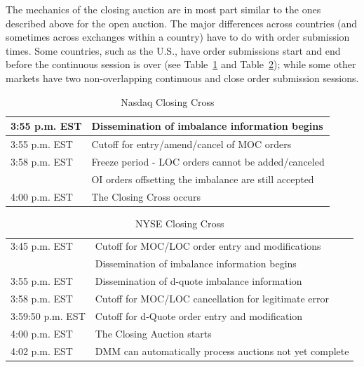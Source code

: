 The mechanics of the closing auction are in most part similar to the ones described above for the open auction. The major differences across countries (and sometimes across exchanges within a country) have to do with order submission times. Some countries, such as the U.S., have order submissions start and end before the continuous session is over (see Table~\ref{tab:NASDAQclose} and Table~\ref{tab:NYSEclose}); while some other markets have two non-overlapping continuous and close order submission sessions.

\begin{table}[!ht]
   \centering
   \caption{Nasdaq Closing Cross\label{tab:NASDAQclose}}
   \begin{tabular}{ll} 
	3:55 p.m. EST & Dissemination of imbalance information begins  \\ \hline
	3:55 p.m. EST & Cutoff for entry/amend/cancel of MOC orders\\ \hline
	3:58 p.m. EST & Freeze period - LOC orders cannot be added/canceled  \\ 
	 & OI orders offsetting the imbalance are still accepted   \\ \hline	
	4:00 p.m. EST & The Closing Cross occurs		
   \end{tabular}
\end{table}	

\begin{table}[!ht]
   \centering
   \caption{NYSE Closing Cross\label{tab:NYSEclose}}
   \begin{tabular}{ll} 
	3:45 p.m. EST & Cutoff for MOC/LOC order entry and modifications  \\ 
	 & Dissemination of imbalance information begins  \\ \hline
	3:55 p.m. EST &  Dissemination of d-quote imbalance information\\ \hline
	3:58 p.m. EST & Cutoff for MOC/LOC cancellation for legitimate error \\ \hline
	3:59:50 p.m. EST & Cutoff for d-Quote order entry and modification \\ \hline
	4:00 p.m. EST & The Closing Auction starts \\ \hline
	4:02 p.m. EST & DMM can automatically process auctions not yet complete
   \end{tabular}
\end{table}	




